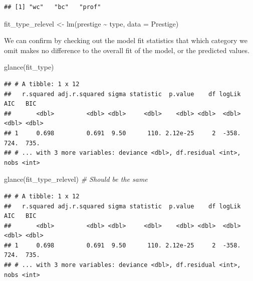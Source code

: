 \documentclass[
  12pt,
  oneside,openany]{book}
\newenvironment{Shaded}{\begin{snugshade}}{\end{snugshade}}
\newcommand{\AttributeTok}[1]{\textcolor[rgb]{0.77,0.63,0.00}{#1}}
\newcommand{\CommentTok}[1]{\textcolor[rgb]{0.56,0.35,0.01}{\textit{#1}}}
\newcommand{\FunctionTok}[1]{\textcolor[rgb]{0.00,0.00,0.00}{#1}}
\newcommand{\NormalTok}[1]{#1}
\newcommand{\OtherTok}[1]{\textcolor[rgb]{0.56,0.35,0.01}{#1}}
\newcommand{\SpecialCharTok}[1]{\textcolor[rgb]{0.00,0.00,0.00}{#1}}
\newcommand{\StringTok}[1]{\textcolor[rgb]{0.31,0.60,0.02}{#1}}
\begin{document}
\begin{Shaded}
\end{Shaded}

\begin{verbatim}
## [1] "wc"   "bc"   "prof"
\end{verbatim}

\begin{Shaded}
\begin{Highlighting}[]
\NormalTok{fit\_type\_relevel }\OtherTok{\textless{}{-}} \FunctionTok{lm}\NormalTok{(prestige }\SpecialCharTok{\textasciitilde{}}\NormalTok{ type, }\AttributeTok{data =}\NormalTok{ Prestige)}
\end{Highlighting}
\end{Shaded}

We can confirm by checking out the model fit statistics that which category we omit makes no difference to the overall fit of the model, or the predicted values.

\begin{Shaded}
\begin{Highlighting}[]
\FunctionTok{glance}\NormalTok{(fit\_type)}
\end{Highlighting}
\end{Shaded}

\begin{verbatim}
## # A tibble: 1 x 12
##   r.squared adj.r.squared sigma statistic  p.value    df logLik   AIC   BIC
##       <dbl>         <dbl> <dbl>     <dbl>    <dbl> <dbl>  <dbl> <dbl> <dbl>
## 1     0.698         0.691  9.50      110. 2.12e-25     2  -358.  724.  735.
## # ... with 3 more variables: deviance <dbl>, df.residual <int>, nobs <int>
\end{verbatim}

\begin{Shaded}
\begin{Highlighting}[]
\FunctionTok{glance}\NormalTok{(fit\_type\_relevel)  }\CommentTok{\# Should be the same}
\end{Highlighting}
\end{Shaded}

\begin{verbatim}
## # A tibble: 1 x 12
##   r.squared adj.r.squared sigma statistic  p.value    df logLik   AIC   BIC
##       <dbl>         <dbl> <dbl>     <dbl>    <dbl> <dbl>  <dbl> <dbl> <dbl>
## 1     0.698         0.691  9.50      110. 2.12e-25     2  -358.  724.  735.
## # ... with 3 more variables: deviance <dbl>, df.residual <int>, nobs <int>
\end{verbatim}
\end{document}
